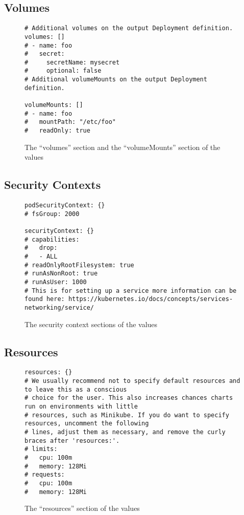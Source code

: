 \subsection{Volumes}
\lipsum[2-4] 

\begin{figure}[h]
\begin{verbatim}
# Additional volumes on the output Deployment definition.
volumes: []
# - name: foo
#   secret:
#     secretName: mysecret
#     optional: false
# Additional volumeMounts on the output Deployment definition.

volumeMounts: []
# - name: foo
#   mountPath: "/etc/foo"
#   readOnly: true
\end{verbatim}
\caption{The \enquote{volumes} section and the \enquote{volumeMounts} section of the \gls{values}}\label{code:volumes_section}
\end{figure}
\clearpage

\subsection{Security Contexts}
\lipsum[2-4] 

\begin{figure}[h]
\begin{verbatim}
podSecurityContext: {}
# fsGroup: 2000

securityContext: {}
# capabilities:
#   drop:
#   - ALL
# readOnlyRootFilesystem: true
# runAsNonRoot: true
# runAsUser: 1000
# This is for setting up a service more information can be found here: https://kubernetes.io/docs/concepts/services-networking/service/
\end{verbatim}
\caption{The security context sections of the \gls{values}}\label{code:security_section}
\end{figure}
\clearpage

\subsection{Resources}
\lipsum[2-4] 

\begin{figure}[h]
\begin{verbatim}
resources: {}
# We usually recommend not to specify default resources and to leave this as a conscious
# choice for the user. This also increases chances charts run on environments with little
# resources, such as Minikube. If you do want to specify resources, uncomment the following
# lines, adjust them as necessary, and remove the curly braces after 'resources:'.
# limits:
#   cpu: 100m
#   memory: 128Mi
# requests:
#   cpu: 100m
#   memory: 128Mi
\end{verbatim}
\caption{The \enquote{resources} section of the \gls{values}}\label{code:resources_section}
\end{figure}
\clearpage

